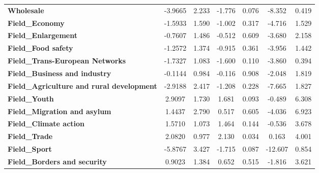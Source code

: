 \documentclass[ 11pt]{article}
\begin{document}
\begin{center}
\begin{longtable}{lcccccc}
\textbf{Wholesale}                                         &      -3.9665  &        2.233     &    -1.776  &         0.076        &       -8.352    &        0.419     \\
\textbf{Field\_Economy}                                    &      -1.5933  &        1.590     &    -1.002  &         0.317        &       -4.716    &        1.529     \\
\textbf{Field\_Enlargement}                                &      -0.7607  &        1.486     &    -0.512  &         0.609        &       -3.680    &        2.158     \\
\textbf{Field\_Food safety}                                &      -1.2572  &        1.374     &    -0.915  &         0.361        &       -3.956    &        1.442     \\
\textbf{Field\_Trans-European Networks}                    &      -1.7327  &        1.083     &    -1.600  &         0.110        &       -3.860    &        0.394     \\
\textbf{Field\_Business and industry}                      &      -0.1144  &        0.984     &    -0.116  &         0.908        &       -2.048    &        1.819     \\
\textbf{Field\_Agriculture and rural development}          &      -2.9188  &        2.417     &    -1.208  &         0.228        &       -7.665    &        1.827     \\
\textbf{Field\_Youth}                                      &       2.9097  &        1.730     &     1.681  &         0.093        &       -0.489    &        6.308     \\
\textbf{Field\_Migration and asylum}                       &       1.4437  &        2.790     &     0.517  &         0.605        &       -4.036    &        6.923     \\
\textbf{Field\_Climate action}                             &       1.5710  &        1.073     &     1.464  &         0.144        &       -0.536    &        3.678     \\
\textbf{Field\_Trade}                                      &       2.0820  &        0.977     &     2.130  &         0.034        &        0.163    &        4.001     \\
\textbf{Field\_Sport}                                      &      -5.8767  &        3.427     &    -1.715  &         0.087        &      -12.607    &        0.854     \\
\textbf{Field\_Borders and security}                       &       0.9023  &        1.384     &     0.652  &         0.515        &       -1.816    &        3.621     \\

\end{longtable}
\end{center}
\end{document}

